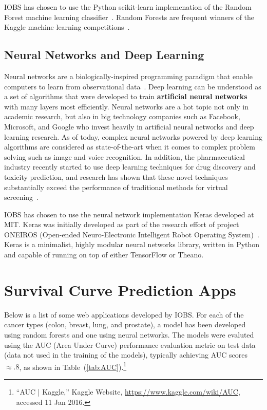 \documentclass[a4paper,11pt]{article}
\begin{document}
IOBS has chosen to use the Python scikit-learn implemenation of the Random Forest machine learning classifier~\cite{rf}.
Random Forests are frequent winners of the Kaggle machine learning competitions~\cite{kagglerf}.




\subsection{Neural Networks and Deep Learning}

Neural networks are a biologically-inspired programming paradigm that enable computers to learn from observational data~\cite{deeplearning}.
Deep learning can be understood as a set of algorithms that were developed to train \textbf{artificial neural networks} with many layers most efficiently.
 Neural networks are a hot topic not only in academic research, but also in big technology companies such as Facebook, Microsoft, and Google who invest heavily in artificial neural networks and deep learning research. As of today, complex neural networks powered by deep learning algorithms are considered as state-of-the-art when it comes to complex problem solving such as image and voice recognition.
In addition, the pharmaceutical industry recently started to use deep learning techniques for drug discovery and toxicity prediction, and research has shown that these novel techniques substantially exceed the performance of traditional methods for virtual screening~\cite{toxicity}.

IOBS has chosen to use the neural network implementation Keras developed at MIT.
Keras was initially developed as part of the research effort of project ONEIROS (Open-ended Neuro-Electronic Intelligent Robot Operating System)~\cite{keras}.
Keras is a minimalist, highly modular neural networks library, written in Python and capable of running on top of either TensorFlow or Theano.

\section{Survival Curve Prediction Apps}

Below is a list of some web applications developed by IOBS.
For each of the cancer types (colon, breast, lung, and prostate), a model has been developed using random forests and one using neural networks. The models were evaluted using the AUC (Area Under Curve) performance evaluation metric on test data (data not used in the training of the models), typically achieving AUC scores  $\approx .8$, as shown in Table~(\ref{tab:AUC}).\footnote{``AUC | Kaggle,'' Kaggle Website, \url{https://www.kaggle.com/wiki/AUC}, accessed 11 Jan 2016.}
 
\end{document}
